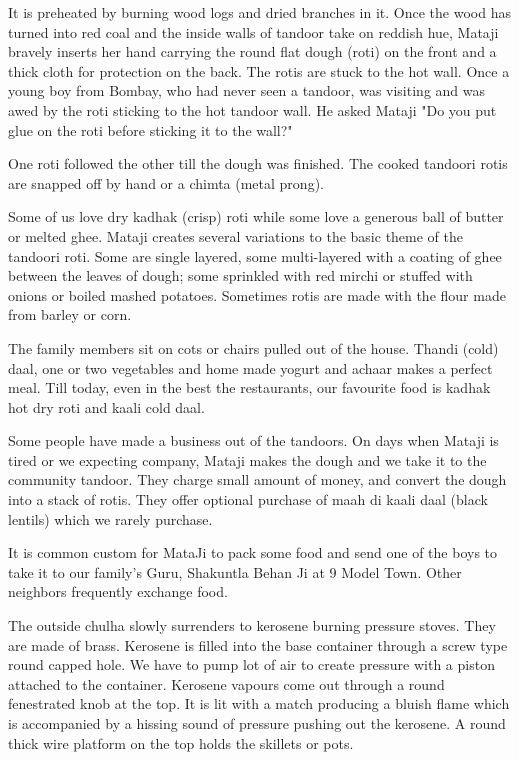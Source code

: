 It is preheated by burning wood logs and dried branches in it. Once the
wood has turned into red coal and the inside walls of tandoor take on
reddish hue, Mataji bravely inserts her hand carrying the round flat dough
(roti) on the front and a thick cloth for protection on the back. The
rotis are stuck to the hot wall. Once a young boy from Bombay, who had
never seen a tandoor, was visiting and was awed by the roti sticking to
the hot tandoor wall. He asked Mataji "Do you put glue on the roti before
sticking it to the wall?" 

One roti followed the other till the dough was finished. The cooked
tandoori rotis are snapped off by hand or a chimta (metal prong). 

Some of us love dry kadhak (crisp) roti while some love a generous ball of
butter or melted ghee. Mataji creates several variations to the basic
theme of the tandoori roti. Some are single layered, some multi-layered
with a coating of ghee between the leaves of dough; some sprinkled with
red mirchi or stuffed with onions or boiled mashed potatoes. Sometimes
rotis are made with the flour made from barley or corn. 

The family members sit on cots or chairs pulled out of the house. Thandi
(cold) daal, one or two vegetables and home made yogurt and achaar makes
a perfect meal. Till today, even in the best the restaurants, our
favourite food is kadhak hot dry roti and kaali cold daal. 

Some people have made a business out of the tandoors. On days when Mataji
is tired or we expecting company, Mataji makes the dough and we take it to
the community tandoor. They charge small amount of money, and convert the
dough into a stack of rotis. They offer optional purchase of maah di kaali
daal (black lentils) which we rarely purchase. 

It is common custom for MataJi to pack some food and send one of the boys
to take it to our family's Guru, Shakuntla Behan Ji at 9 Model Town. Other
neighbors frequently exchange food. 

The outside chulha slowly surrenders to kerosene burning pressure stoves.
They are made of brass. Kerosene is filled into the base container through
a screw type round capped hole. We have to pump lot of air to create
pressure with a piston attached to the container. Kerosene vapours come
out through a round fenestrated knob at the top. It is lit with a match
producing a bluish flame which is accompanied by a hissing sound of
pressure pushing out the kerosene. A round thick wire platform on the top
holds the skillets or pots. 

